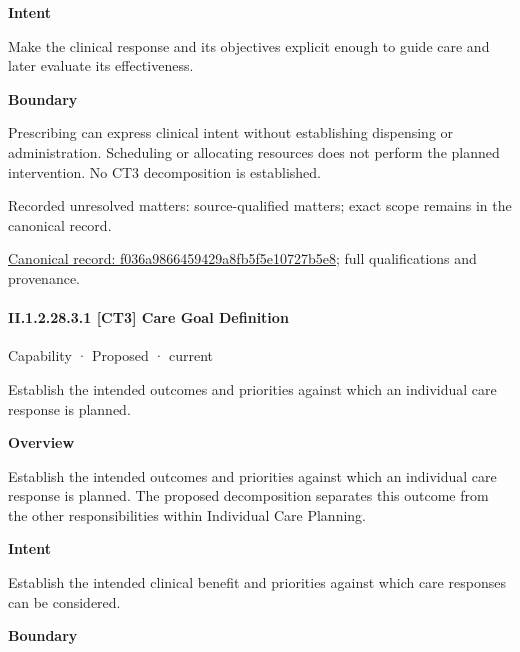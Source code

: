 \textbf{Intent}



Make the clinical response and its objectives explicit enough to guide care and later evaluate its effectiveness.



\textbf{Boundary}



Prescribing can express clinical intent without establishing dispensing or administration. Scheduling or allocating resources does not perform the planned intervention. No CT3 decomposition is established.


{\small Recorded unresolved matters: source-qualified matters; exact scope remains in the canonical record.}\par
{\footnotesize \href{../../../../continuum/strategy/capability/f036a9866459429a8fb5f5e10727b5e8.md}{Canonical record: f036a9866459429a8fb5f5e10727b5e8}; full qualifications and provenance.}\par
\paragraph*{II.1.2.28.3.1 [CT3] Care Goal Definition}
\label{navigation:II.1.2.28.3.1}

\label{element:609e1bef516b44bb976b5dbebe7f684b}
{\small Capability · Proposed · current}\par

Establish the intended outcomes and priorities against which an individual care response is planned.



\textbf{Overview}



Establish the intended outcomes and priorities against which an individual care response is planned. The proposed decomposition separates this outcome from the other responsibilities within Individual Care Planning.



\textbf{Intent}



Establish the intended clinical benefit and priorities against which care responses can be considered.



\textbf{Boundary}



